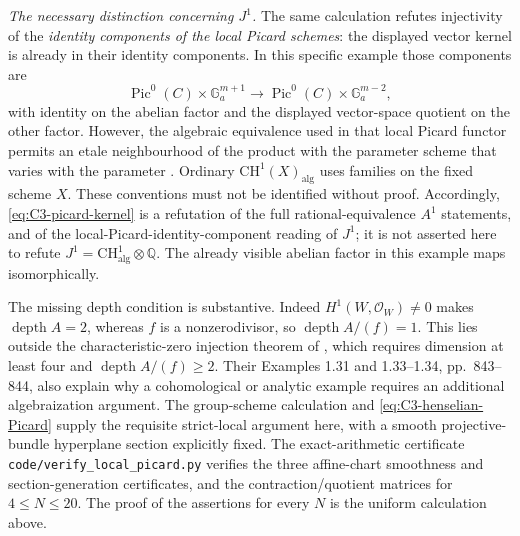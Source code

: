 \emph{The necessary distinction concerning $J^1$.}
The same calculation refutes injectivity of the
\emph{identity components of the local Picard schemes}:
the displayed vector kernel is already in their
identity components. In this specific example those
components are
\[
 \operatorname{Pic}^0(C)\times\mathbb G_a^{m+1}
       \longrightarrow
 \operatorname{Pic}^0(C)\times\mathbb G_a^{m-2},
\]
with identity on the abelian factor and the displayed
vector-space quotient on the other factor.
However, the algebraic equivalence used in that
local Picard functor permits an etale neighbourhood
of the product with the parameter scheme that varies
with the parameter
\citep[Definition 3.3, clauses (2.a)--(2.c),
pp.~467--468]{D_Kollar2016LocalPicard}.
Ordinary $\mathrm{CH}^1(X)_{\mathrm{alg}}$ uses
families on the fixed scheme $X$. These conventions
must not be identified without proof. Accordingly,
\eqref{eq:C3-picard-kernel} is a refutation of the
full rational-equivalence $A^1$ statements, and of
the local-Picard-identity-component reading of $J^1$;
it is not asserted here to refute
$J^1=\mathrm{CH}^1_{\mathrm{alg}}\otimes\mathbb Q$.
The already visible abelian factor in this example
maps isomorphically.

The missing depth condition is substantive.
Indeed $H^1(W,\mathcal O_W)\ne0$ makes
$\operatorname{depth}A=2$, whereas $f$ is a
nonzerodivisor, so $\operatorname{depth}A/(f)=1$.
This lies outside the characteristic-zero injection
theorem of \citet[Theorem 0.1, p.~833]{D_BhattDeJong2014},
which requires dimension at least four and
$\operatorname{depth}A/(f)\ge2$.
Their Examples 1.31 and 1.33--1.34, pp.~843--844,
also explain why a cohomological or analytic example
requires an additional algebraization argument.
The group-scheme calculation and
\eqref{eq:C3-henselian-Picard} supply the requisite
strict-local argument here, with a smooth projective-bundle
hyperplane section explicitly fixed.
The exact-arithmetic certificate
\texttt{code/verify\_local\_picard.py} verifies the
three affine-chart smoothness and section-generation
certificates, and the contraction/quotient matrices for
$4\le N\le20$. The proof of the assertions for every
$N$ is the uniform calculation above.
